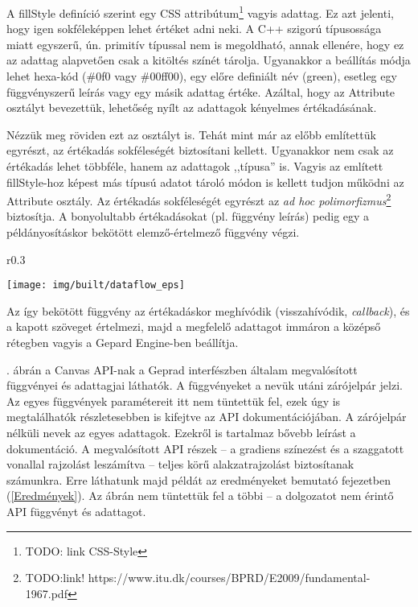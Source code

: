 \documentclass[12pt]{report}
\theoremstyle{definition}
\newcommand{\inenglish}[1]{\textsl{#1}}
\newcommand{\func}[1]{{\textsf{\footnotesize{#1}}}}
\newcommand{\melyikoldalra}{r}
\begin{document}
A \func{fillStyle} definíció szerint egy CSS attribútum\footnote{TODO: link
CSS-Style} vagyis adattag. Ez azt jelenti, hogy igen sokféleképpen lehet
értéket adni neki. A C++ szigorú típusossága miatt egyszerű, ún. primitív
típussal nem is megoldható, annak ellenére, hogy ez az adattag alapvetően csak
a kitöltés színét tárolja. Ugyanakkor a beállítás módja lehet hexa-kód
(\func{\#0f0} vagy \func{\#00ff00}), egy előre definiált név (\func{green}),
esetleg egy függvényszerű leírás vagy egy másik adattag értéke. Azáltal, hogy
az \func{Attribute} osztályt bevezettük, lehetőség nyílt az adattagok kényelmes
értékadásának.

Nézzük meg röviden ezt az osztályt is. Tehát mint már az előbb említettük
egyrészt, az értékadás sokféleségét biztosítani kellett. Ugyanakkor nem csak az
értékadás lehet többféle, hanem az adattagok ,,típusa'' is. Vagyis az említett
\func{fillStyle}-hoz képest más típusú adatot tároló módon is kellett tudjon
működni az \func{Attribute} osztály. Az értékadás sokféleségét egyrészt az
\emph{ad hoc polimorfizmus}\footnote{TODO:link!
https://www.itu.dk/courses/BPRD/E2009/fundamental-1967.pdf} biztosítja. A
bonyolultabb értékadásokat (pl. függvény leírás) pedig egy a példányosításkor
bekötött elemző-értelmező függvény végzi.
    \begin{wrapfigure}{\melyikoldalra}{0.3\textwidth}
    \begin{center}
      \texttt{[image: img/built/dataflow\_eps]}
    \end{center}
      \caption{\label{dataflow-API-diagram} A \emph{felső} réteg, vagyis
      a Gepard interfész függvényei és adattagjai}
    \end{wrapfigure}
Az így bekötött függvény az
értékadáskor meghívódik (visszahívódik, \inenglish{callback}), és a kapott
szöveget értelmezi, majd a megfelelő adattagot immáron a középső rétegben
vagyis a \func{Gepard Engine}-ben beállítja.

. ábrán a Canvas API-nak a Geprad interfészben
általam megvalósított függvényei és adattagjai láthatók. A függvényeket a nevük
utáni zárójelpár jelzi. Az egyes függvények paramétereit itt nem tüntettük fel,
ezek úgy is megtalálhatók részletesebben is kifejtve az API dokumentációjában.
A zárójelpár nélküli nevek az egyes adattagok. Ezekről is tartalmaz bővebb
leírást a dokumentáció. A megvalósított API részek -- a gradiens színezést és a
szaggatott vonallal rajzolást leszámítva -- teljes körű alakzatrajzolást
biztosítanak számunkra. Erre láthatunk majd példát az eredményeket bemutató
fejezetben (\ref{Eredmények}). Az ábrán nem tüntettük fel a többi -- a
dolgozatot nem érintő API függvényt és adattagot.
\end{document}
